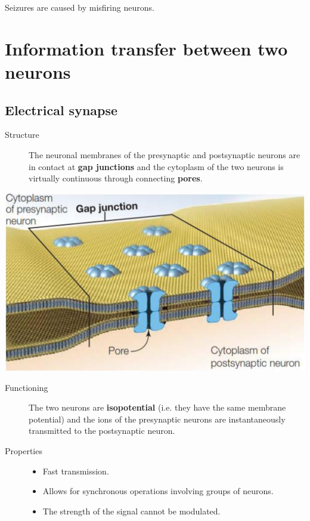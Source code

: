 \begin{example}
    Seizures are caused by misfiring neurons.
\end{example}



\section{Information transfer between two neurons}


\subsection{Electrical synapse}

\begin{minipage}{0.55\textwidth}
    \begin{description}
        \item[Structure] 
            The neuronal membranes of the presynaptic and postsynaptic neurons are in contact at \textbf{gap junctions} and
            the cytoplasm of the two neurons is virtually continuous through connecting \textbf{pores}.
    \end{description}
\end{minipage}
\begin{minipage}{0.35\textwidth}
    \centering
    \includegraphics[width=\linewidth]{./img/electric_synapse.png}
\end{minipage}

\begin{description}
    \item[Functioning]
        The two neurons are \textbf{isopotential} (i.e. they have the same membrane potential) and 
        the ions of the presynaptic neurons are instantaneously transmitted to the postsynaptic neuron.

    \item[Properties] \phantom{}
        \begin{itemize}
            \item Fast transmission.
            \item Allows for synchronous operations involving groups of neurons.
            \item The strength of the signal cannot be modulated.
        \end{itemize}
\end{description}


